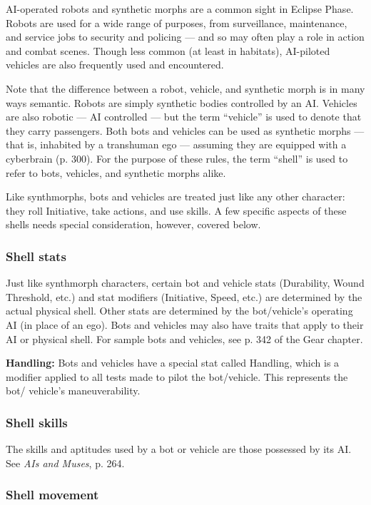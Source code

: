 AI-operated robots and synthetic morphs are a common sight in Eclipse Phase. Robots are used for a wide range of purposes, from surveillance, maintenance, and service jobs to security and policing --- and so may often play a role in action and combat scenes. Though less common (at least in habitats), AI-piloted vehicles are also frequently used and encountered. 

Note that the difference between a robot, vehicle, and synthetic morph is in many ways semantic. Robots are simply synthetic bodies controlled by an AI. Vehicles are also robotic --- AI controlled --- but the term ``vehicle'' is used to denote that they carry passengers. Both bots and vehicles can be used as synthetic morphs --- that is, inhabited by a transhuman ego --- assuming they are equipped with a cyberbrain (p. 300). For the purpose of these rules, the term ``shell'' is used to refer to bots, vehicles, and synthetic morphs alike. 

Like synthmorphs, bots and vehicles are treated just like any other character: they roll Initiative, take actions, and use skills. A few specific aspects of these shells needs special consideration, however, covered below. 

\subsubsection{Shell stats} 

Just like synthmorph characters, certain bot and vehicle stats (Durability, Wound Threshold, etc.) and stat modifiers (Initiative, Speed, etc.) are determined by the actual physical shell. Other stats are determined by the bot/vehicle’s operating AI (in place of an ego). Bots and vehicles may also have traits that apply to their AI or physical shell. For sample bots and vehicles, see p. 342 of the Gear chapter. 

\textbf{Handling:} Bots and vehicles have a special stat called Handling, which is a modifier applied to all tests made to pilot the bot/vehicle. This represents the bot/ vehicle’s maneuverability. 

\subsubsection{Shell skills} 

The skills and aptitudes used by a bot or vehicle are those possessed by its AI. See \emph{AIs and Muses}, p. 264. 

\subsubsection{Shell movement} 

